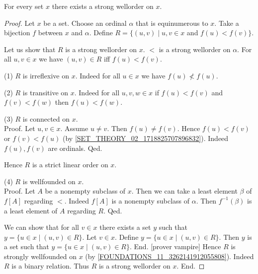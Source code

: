\documentclass[../set-theory.tex]{subfiles}
\begin{document}
  \begin{forthel}
    \begin{corollary}
      For every set $x$ there exists a strong wellorder on $x$.
    \end{corollary}
    \begin{proof}
      Let $x$ be a set.
      Choose an ordinal $\alpha$ that is equinumerous to $x$.
      Take a bijection $f$ between $x$ and $\alpha$.
      Define $R = \{ (u,v) \mid u, v \in x$ and $f(u) < f(v) \}$.

      Let us show that $R$ is a strong wellorder on $x$.
        ${<}$ is a strong wellorder on $\alpha$.
        For all $u, v \in x$ we have $(u, v) \in R$ iff $f(u) < f(v)$.

        (1) $R$ is irreflexive on $x$.
        Indeed for all $u \in x$ we have $f(u) \nless f(u)$.

        (2) $R$ is transitive on $x$.
        Indeed for all $u, v, w \in x$ if $f(u) < f(v)$ and $f(v) < f(w)$ then
        $f(u) < f(w)$.

        (3) $R$ is connected on $x$. \\
        Proof.
          Let $u, v \in x$.
          Assume $u \neq v$.
          Then $f(u) \neq f(v)$.
          Hence $f(u) < f(v)$ or $f(v) < f(u)$ (by
          \cref{SET_THEORY_02_1718825707896832}).
          Indeed $f(u), f(v)$ are ordinals.
        Qed.

        Hence $R$ is a strict linear order on $x$.

        (4) $R$ is wellfounded on $x$. \\
        Proof.
          Let $A$ be a nonempty subclass of $x$.
          Then we can take a least element $\beta$ of $f[A]$ regarding
          ${<}$.
          Indeed $f[A]$ is a nonempty subclass of $\alpha$.
          Then $f^{-1}(\beta)$ is a least element of $A$ regarding $R$.
        Qed.

        We can show that for all $v \in x$ there exists a set $y$ such that
        $y = \{ u \in x \mid (u,v) \in R \}$.
          Let $v \in x$.
          Define $y = \{ u \in x \mid (u,v) \in R \}$.
          Then $y$ is a set such that $y = \{ u \in x \mid (u,v) \in R \}$.
        End.
        [prover vampire]
        Hence $R$ is strongly wellfounded on $x$ (by
        \cref{FOUNDATIONS_11_3262141912055808}).
        Indeed $R$ is a binary relation.
        Thus $R$ is a strong wellorder on $x$.
      End.
    \end{proof}
  \end{forthel}
\end{document}
